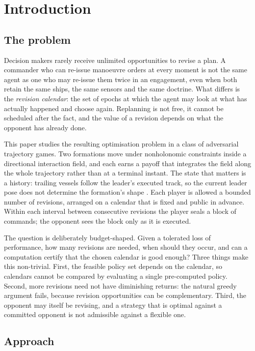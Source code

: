 \section{Introduction}\label{sec:intro}

\subsection{The problem}

Decision makers rarely receive unlimited opportunities to revise a plan.
A commander who can re-issue manoeuvre orders at every moment is not the same
agent as one who may re-issue them twice in an engagement, even when both
retain the same ships, the same sensors and the same doctrine. What differs is
the \emph{revision calendar}: the set of epochs at which the agent may look at
what has actually happened and choose again. Replanning is not free, it cannot
be scheduled after the fact, and the value of a revision depends on what the
opponent has already done.

This paper studies the resulting optimisation problem in a class of
adversarial trajectory games. Two formations move under nonholonomic
constraints inside a directional interaction field, and each earns a payoff
that integrates the field along the whole trajectory rather than at a terminal
instant. The state that matters is a history: trailing vessels follow the
leader's executed track, so the current leader pose does not determine the
formation's shape \citep{stengel1996}. Each player is allowed a bounded number
of revisions, arranged on a calendar that is fixed and public in advance.
Within each interval between consecutive revisions the player seals a block of
commands; the opponent sees the block only as it is executed.

The question is deliberately budget-shaped. Given a tolerated loss of
performance, how many revisions are needed, when should they occur, and can a
computation certify that the chosen calendar is good enough? Three things make
this non-trivial. First, the feasible policy set depends on the calendar, so
calendars cannot be compared by evaluating a single pre-computed policy.
Second, more revisions need not have diminishing returns: the natural greedy
argument fails, because revision opportunities can be complementary. Third,
the opponent may itself be revising, and a strategy that is optimal against a
committed opponent is not admissible against a flexible one.

\subsection{Approach}

